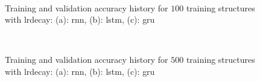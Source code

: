 \documentclass[conference]{IEEEtran}
\begin{document}
\begin{figure}[htp]
	\centering
	\quad
	\\
	\caption{Training and validation accuracy history for $ 100 $ training structures with \gls{lrdecay}: (a): \gls{rnn}, (b): \gls{lstm}, (c): \gls{gru}}
	\label{fig:accuracy_100_structures_fine_tuning_rnn}
\end{figure}

\begin{figure}[htp]
	\centering
	\quad
	\\
	\caption{Training and validation accuracy history for $ 500 $ training structures with \gls{lrdecay}: (a): \gls{rnn}, (b): \gls{lstm}, (c): \gls{gru}}
	\label{fig:accuracy_500_structures_fine_tuning_rnn}
\end{figure}
\end{document}
